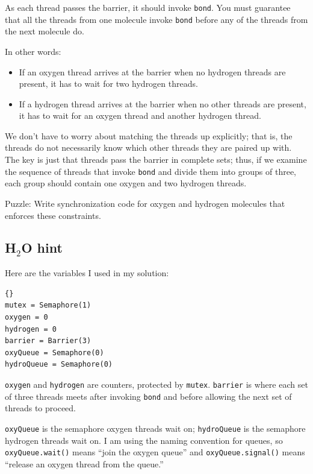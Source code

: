 \documentclass{book}
\begin{document}
As each thread passes the barrier, it should invoke
    {\tt bond}.  You must guarantee that all the threads
from one molecule invoke {\tt bond} before any of the threads
from the next molecule do.

In other words:

\begin{itemize}

    \item If an oxygen thread arrives at the barrier when no
          hydrogen threads are present, it has to wait for two
          hydrogen threads.

    \item If a hydrogen thread arrives at the barrier when
          no other threads are present, it has to wait for an
          oxygen thread and another hydrogen thread.

\end{itemize}

We don't have to worry about matching the threads up explicitly; that
is, the threads do not necessarily know which other threads they are
paired up with.  The key is just that threads pass the barrier in
complete sets; thus, if we examine the sequence of threads that invoke
    {\tt bond} and divide them into groups of three, each group should
contain one oxygen and two hydrogen threads.

Puzzle: Write synchronization code for oxygen and hydrogen
molecules that enforces these constraints.



\subsection {H$_2$O hint}

Here are the variables I used in my solution:

\begin{lstlisting}[title={Water building hint}]{}
mutex = Semaphore(1)
oxygen = 0
hydrogen = 0
barrier = Barrier(3)
oxyQueue = Semaphore(0)
hydroQueue = Semaphore(0)
\end{lstlisting}

{\tt oxygen} and {\tt hydrogen} are counters, protected by {\tt mutex}.
{\tt barrier} is where each set of three threads meets after
invoking {\tt bond} and before allowing the next set of threads
to proceed.

    {\tt oxyQueue} is the semaphore oxygen threads wait on;
{\tt hydroQueue} is the semaphore hydrogen threads wait on.
I am using the naming convention for queues, so
    {\tt oxyQueue.wait()} means ``join the oxygen queue'' and
    {\tt oxyQueue.signal()} means ``release an oxygen thread from
the queue.''
\end{document}

